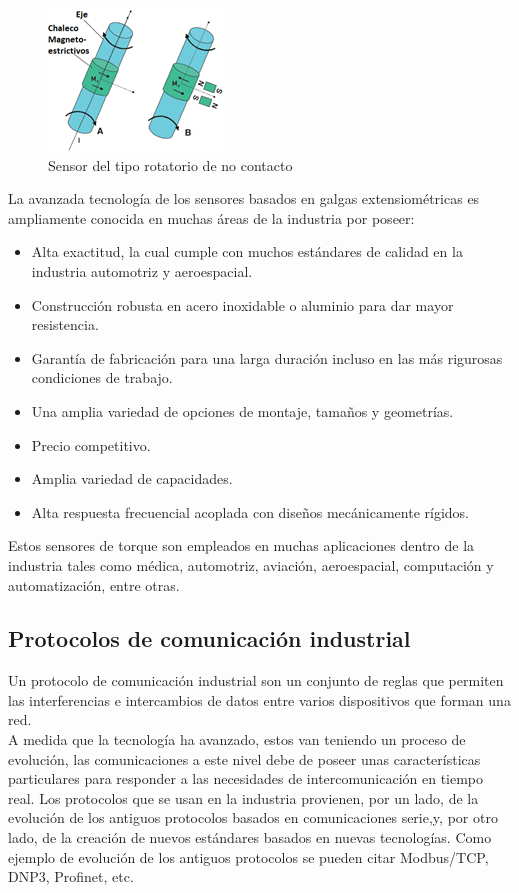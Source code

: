 \documentclass[12pt,titlepage]{article}
\begin{document}
\begin{figure}[htbp]
\hspace*{5.6cm} 
\includegraphics[scale=0.89]{no_contact_sens}
\caption{Sensor del tipo rotatorio de no contacto}
\end{figure}
\newpage
La avanzada tecnología de los sensores basados en galgas extensiométricas es ampliamente conocida en muchas áreas de la industria por poseer: \\

\begin{itemize}
\item Alta exactitud, la cual cumple con muchos estándares de calidad en la industria automotriz y aeroespacial.
\item Construcción robusta en acero inoxidable o aluminio para dar mayor resistencia. 
\item Garantía de fabricación para una larga duración incluso en las más rigurosas condiciones de trabajo. 
\item Una amplia variedad de opciones de montaje, tamaños y geometrías. 
\item Precio competitivo.
\item Amplia variedad de capacidades.
\item Alta respuesta frecuencial acoplada con diseños mecánicamente rígidos. 
\end{itemize}

Estos sensores de torque son empleados en muchas aplicaciones dentro de la industria tales como médica, automotriz, aviación, aeroespacial, computación y automatización, entre otras. \\
\subsection{Protocolos de comunicación industrial}
Un protocolo de comunicación industrial son un conjunto de reglas que permiten las interferencias e intercambios de datos entre varios dispositivos que forman una red. \\

A medida que la tecnología ha avanzado, estos van teniendo un proceso de evolución, las comunicaciones a este nivel debe de poseer unas características particulares para responder a las necesidades de intercomunicación en tiempo real. Los protocolos que se usan en la industria provienen, por un lado, de la evolución de los antiguos protocolos basados en comunicaciones serie,y, por otro lado, de la creación de nuevos estándares basados en nuevas tecnologías. Como ejemplo de evolución de los antiguos protocolos se pueden citar Modbus/TCP, DNP3, Profinet, etc. \\
\end{document}
